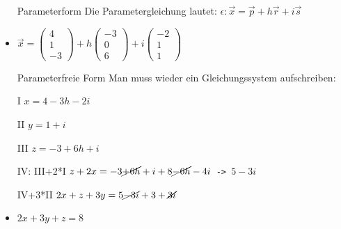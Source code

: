 \documentclass{article}
\begin{document}
\begin{itemize}
\begin{itemize}
				\item[Parameterform]{Die Parametergleichung lautet: $\epsilon:\vec{x}=\vec{p}+h \vec{r}+i \vec{s}$}
				\item{$\vec{x}=\begin{pmatrix} 4 \\ 1 \\ -3 \end{pmatrix}+h \begin{pmatrix} -3 \\ 0 \\ 6 \end{pmatrix}+i \begin{pmatrix} -2 \\ 1 \\ 1 \end{pmatrix}$}
				\item[Parameterfreie Form]{Man muss wieder ein Gleichungssystem aufschreiben:}
				\item[I]{$x=4-3h-2i$}
				\item[II]{$y=1+i$}
				\item[III]{$z=-3+6h+i$}
				\item[IV: III+2*I]{$z+2x=-3\cancel{+6h}+i+8\cancel{-6h}-4i$\texttt{ -> }$5-3i$}
				\item[IV+3*II]{$2x+z+3y=5\cancel{-3i}+3+\cancel{3i}$}
				\item{$2x+3y+z=8$}
			\end{itemize}
	\end{itemize}
\end{document}
